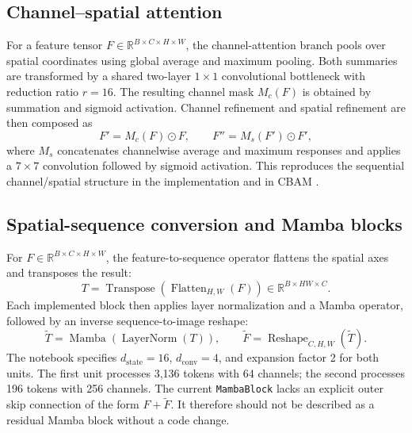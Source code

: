 \documentclass[11pt,a4paper]{article}
\begin{document}
\subsection{Channel--spatial attention}\label{subsec:cbam}
For a feature tensor $F\in\mathbb{R}^{B\times C\times H\times W}$, the channel-attention branch pools over spatial coordinates using global average and maximum pooling. Both summaries are transformed by a shared two-layer $1\times1$ convolutional bottleneck with reduction ratio $r=16$. The resulting channel mask $M_c(F)$ is obtained by summation and sigmoid activation. Channel refinement and spatial refinement are then composed as
\begin{equation}\label{eq:cbam}
 F' = M_c(F)\odot F, \qquad F'' = M_s(F')\odot F',
\end{equation}
where $M_s$ concatenates channelwise average and maximum responses and applies a $7\times7$ convolution followed by sigmoid activation. This reproduces the sequential channel/spatial structure in the implementation and in CBAM \citep{woo2018cbam}.

\subsection{Spatial-sequence conversion and Mamba blocks}\label{subsec:mamba}
For $F\in\mathbb{R}^{B\times C\times H\times W}$, the feature-to-sequence operator flattens the spatial axes and transposes the result:
\begin{equation}
 T = \operatorname{Transpose}(\operatorname{Flatten}_{H,W}(F))\in\mathbb{R}^{B\times HW\times C}.
\end{equation}
Each implemented block then applies layer normalization and a Mamba operator, followed by an inverse sequence-to-image reshape:
\begin{equation}\label{eq:mamba}
 \widetilde{T}=\operatorname{Mamba}(\operatorname{LayerNorm}(T)), \qquad
 \widetilde{F}=\operatorname{Reshape}_{C,H,W}(\widetilde{T}).
\end{equation}
The notebook specifies $d_{\mathrm{state}}=16$, $d_{\mathrm{conv}}=4$, and expansion factor 2 for both units. The first unit processes 3,136 tokens with 64 channels; the second processes 196 tokens with 256 channels. The current \texttt{MambaBlock} lacks an explicit outer skip connection of the form $F+\widetilde{F}$. It therefore should not be described as a residual Mamba block without a code change.
\end{document}
